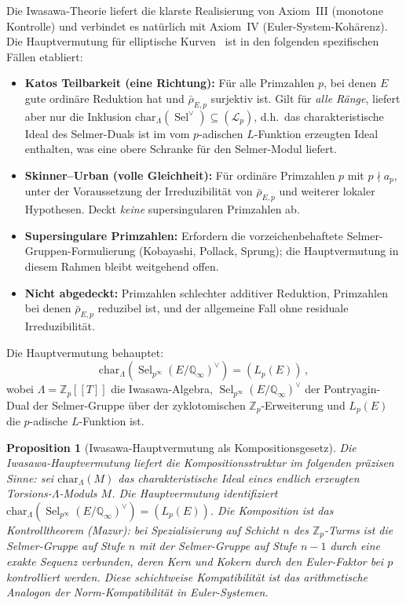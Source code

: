 \documentclass[aps,prd,twocolumn,superscriptaddress,nofootinbib,floatfix]{revtex4-2}
\newtheorem{proposition}[theorem]{Proposition}
\theoremstyle{definition}
\theoremstyle{remark}
\DeclareMathOperator{\Sel}{Sel}
\begin{document}
Die Iwasawa-Theorie liefert die klarste Realisierung von Axiom~III (monotone Kontrolle) und verbindet es natürlich mit Axiom~IV (Euler-System-Kohärenz). Die Hauptvermutung für elliptische Kurven~\cite{Kato2004,SkinnerUrban2014} ist in den folgenden spezifischen Fällen etabliert:
\begin{itemize}
\item \textbf{Katos Teilbarkeit (eine Richtung):} Für alle Primzahlen $p$, bei denen $E$ gute ordinäre Reduktion hat und $\bar{\rho}_{E,p}$ surjektiv ist. Gilt für \textit{alle Ränge}, liefert aber nur die Inklusion $\mathrm{char}_\Lambda(\Sel^\vee) \subseteq (\mathcal{L}_p)$, d.h.\ das charakteristische Ideal des Selmer-Duals ist im vom $p$-adischen $L$-Funktion erzeugten Ideal enthalten, was eine obere Schranke für den Selmer-Modul liefert.
\item \textbf{Skinner--Urban (volle Gleichheit):} Für ordinäre Primzahlen $p$ mit $p \nmid a_p$, unter der Voraussetzung der Irreduzibilität von $\bar{\rho}_{E,p}$ und weiterer lokaler Hypothesen. Deckt \textit{keine} supersingularen Primzahlen ab.
\item \textbf{Supersingulare Primzahlen:} Erfordern die vorzeichenbehaftete Selmer-Gruppen-Formulierung (Kobayashi, Pollack, Sprung); die Hauptvermutung in diesem Rahmen bleibt weitgehend offen.
\item \textbf{Nicht abgedeckt:} Primzahlen schlechter additiver Reduktion, Primzahlen bei denen $\bar{\rho}_{E,p}$ reduzibel ist, und der allgemeine Fall ohne residuale Irreduzibilität.
\end{itemize}
Die Hauptvermutung behauptet:
\begin{equation}
\mathrm{char}_{\Lambda}\!\left(\Sel_{p^\infty}(E/\mathbb{Q}_\infty)^\vee\right) = (L_p(E))\,,
\label{eq:iwasawa_mc}
\end{equation}
wobei $\Lambda = \mathbb{Z}_p[[T]]$ die Iwasawa-Algebra, $\Sel_{p^\infty}(E/\mathbb{Q}_\infty)^\vee$ der Pontryagin-Dual der Selmer-Gruppe über der zyklotomischen $\mathbb{Z}_p$-Erweiterung und $L_p(E)$ die $p$-adische $L$-Funktion ist.

\begin{proposition}[Iwasawa-Hauptvermutung als Kompositionsgesetz]
\label{prop:iwasawa_composition}
Die Iwasawa-Hauptvermutung liefert die Kompositionsstruktur im folgenden präzisen Sinne: sei $\mathrm{char}_\Lambda(M)$ das charakteristische Ideal eines endlich erzeugten Torsions-$\Lambda$-Moduls $M$. Die Hauptvermutung identifiziert $\mathrm{char}_\Lambda(\Sel_{p^\infty}(E/\mathbb{Q}_\infty)^\vee) = (L_p(E))$. Die \glqq Komposition\grqq{} ist das Kontrolltheorem (Mazur): bei Spezialisierung auf Schicht $n$ des $\mathbb{Z}_p$-Turms ist die Selmer-Gruppe auf Stufe $n$ mit der Selmer-Gruppe auf Stufe $n-1$ durch eine exakte Sequenz verbunden, deren Kern und Kokern durch den Euler-Faktor bei $p$ kontrolliert werden. Diese schichtweise Kompatibilität ist das arithmetische Analogon der Norm-Kompatibilität in Euler-Systemen.
\end{proposition}
\end{document}
